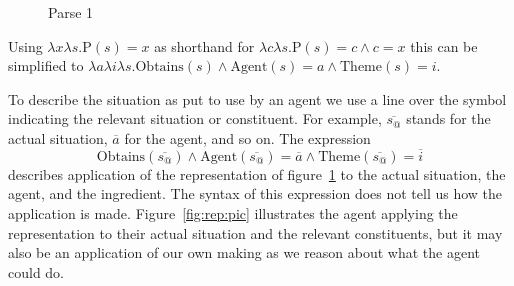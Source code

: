 \documentclass[10pt]{article}
\begin{document}
\begin{figure}[h]
  \centering
  \caption{Parse 1}
  \label{fig:parse:1}
\end{figure}


Using \(\lambda x \lambda s. \text{P}(s) = x\) as shorthand for \(\lambda c \lambda s. \text{P}(s) = c \land c = x\) this can be simplified to \(\lambda a\lambda i\lambda s.\text{Obtains}(s) \land \text{Agent}(s) = a \land \text{Theme}(s) = i\).

To describe the situation as put to use by an agent we use a line over the symbol indicating the relevant situation or constituent.
For example, \(\overline{s_{@}}\) stands for the actual situation, \(\overline{a}\) for the agent, and so on.
The expression
\[
  \text{Obtains}(\overline{s_{@}}) \land
  \text{Agent}(\overline{s_{@}}) = \overline{a} \land
  \text{Theme}(\overline{s_{@}}) = \overline{i}
\]
describes application of the representation of figure~\ref{fig:parse:1} to the actual situation, the agent, and the ingredient.
The syntax of this expression does not tell us how the application is made.
Figure~\ref{fig:rep:pic} illustrates the agent applying the representation to their actual situation and the relevant constituents, but it may also be an application of our own making as we reason about what the agent could do.
\end{document}

